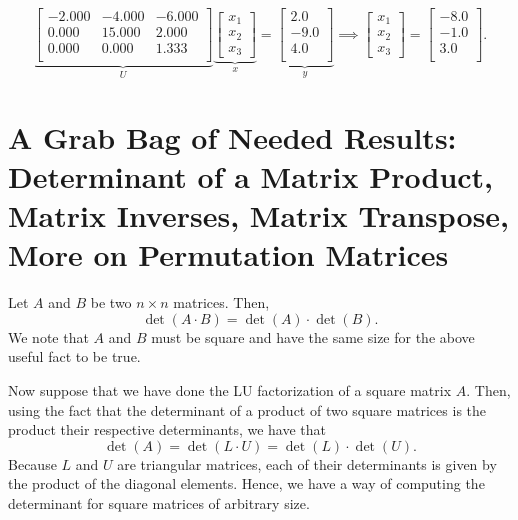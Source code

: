 \documentclass[letterpaper]{book}
\begin{document}
$$ \underbrace{\left[
\begin{array}{rrr}
-2.000 & -4.000 & -6.000 \\
0.000 & 15.000 & 2.000 \\
0.000 & 0.000 & 1.333 \\
\end{array}
\right]}_{U} \underbrace{\begin{bmatrix}x_1 \\x_2 \\ x_3 \end{bmatrix}}_{x} =\underbrace{\left[
\begin{array}{r}
2.0 \\
-9.0 \\
4.0 \\
\end{array}
\right]}_{y} \implies\begin{bmatrix}x_1 \\x_2 \\ x_3 \end{bmatrix} = \left[
\begin{array}{r}
-8.0 \\
-1.0 \\
3.0 \\
\end{array}
\right]. $$
\Qed

\setcounter{chapter}{6}
\setcounter{section}{-1}
\section{A Grab Bag of Needed Results: Determinant of a Matrix Product, Matrix Inverses, Matrix Transpose, More on Permutation Matrices}

\begin{tcolorbox}
Let $A$ and $B$ be two $n \times n$ matrices. Then,
$$\det(A \cdot B) = \det(A) \cdot \det(B). $$
We note that $A$ and $B$ must be square and have the same size for the above useful fact to be true. 
\end{tcolorbox}

\vspace*{.2cm}
\begin{tcolorbox}[sharp corners, colback=green!30, colframe=green!80!blue, title=\textbf{\Large Matrix Determinant via LU Factorization}]
Now suppose that we have done the LU factorization of a square matrix $A$. Then, 
using the fact that the determinant of a product of two square matrices is the product their respective determinants, we have that 
$$\det(A) = \det(L \cdot U) = \det(L) \cdot \det(U). $$
Because $L$ and $U$ are triangular matrices, each of their determinants is given by the product of the diagonal elements. Hence, we have a way of computing the determinant for square matrices of arbitrary size.
\end{tcolorbox}
\end{document}
